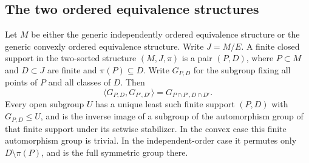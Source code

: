 \subsection{The two ordered equivalence structures}

\begin{lemma}
\label{B:equivalence-supports}
Let $M$ be either the generic independently ordered equivalence
structure or the generic convexly ordered equivalence structure.
Write $J=M/E$. A finite closed support in the two-sorted structure
$(M,J,\pi)$ is a pair $(P,D)$, where $P\subset M$ and $D\subset J$
are finite and $\pi(P)\subseteq D$. Write $G_{P,D}$ for the subgroup
fixing all points of $P$ and all classes of $D$. Then
\[
 \langle G_{P,D},G_{P',D'}\rangle
   =G_{P\cap P',D\cap D'}.
\]
Every open subgroup $U$ has a unique least such finite support
$(P,D)$ with $G_{P,D}\leq U$, and is the inverse image of a subgroup
of the automorphism group of that finite support under its setwise
stabilizer. In the convex case this finite automorphism group is
trivial. In the independent-order case it permutes only
$D\setminus\pi(P)$, and is the full symmetric group there.
\end{lemma}
